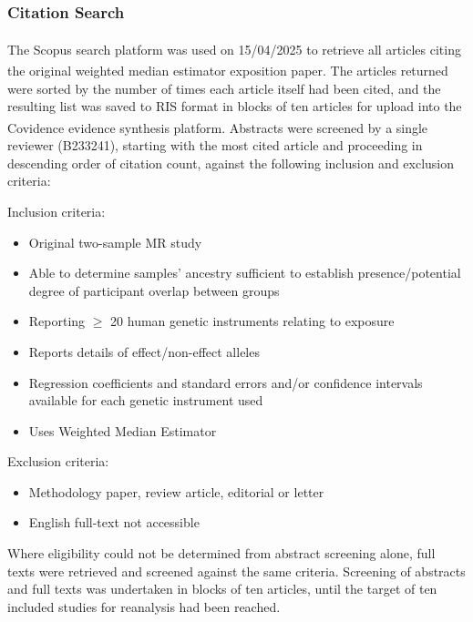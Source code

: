 \documentclass[
]{article}
\begin{document}
\subsubsection{Citation Search}\label{citation-search}

The Scopus search platform\textsuperscript{} was used on 15/04/2025 to retrieve all articles citing the original weighted median estimator exposition paper\textsuperscript{}. The articles returned were sorted by the number of times each article itself had been cited, and the resulting list was saved to RIS format in blocks of ten articles for upload into the Covidence evidence synthesis platform\textsuperscript{}. Abstracts were screened by a single reviewer (B233241), starting with the most cited article and proceeding in descending order of citation count, against the following inclusion and exclusion criteria:

Inclusion criteria:

\begin{itemize}
\item
  Original two-sample MR study
\item
  Able to determine samples' ancestry sufficient to establish presence/potential degree of participant overlap between groups
\item
  Reporting \(\ge\) 20 human genetic instruments relating to exposure
\item
  Reports details of effect/non-effect alleles
\item
  Regression coefficients and standard errors and/or confidence intervals available for each genetic instrument used
\item
  Uses Weighted Median Estimator
\end{itemize}

Exclusion criteria:

\begin{itemize}
\item
  Methodology paper, review article, editorial or letter
\item
  English full-text not accessible
\end{itemize}

Where eligibility could not be determined from abstract screening alone, full texts were retrieved and screened against the same criteria. Screening of abstracts and full texts was undertaken in blocks of ten articles, until the target of ten included studies for reanalysis had been reached.
\end{document}
